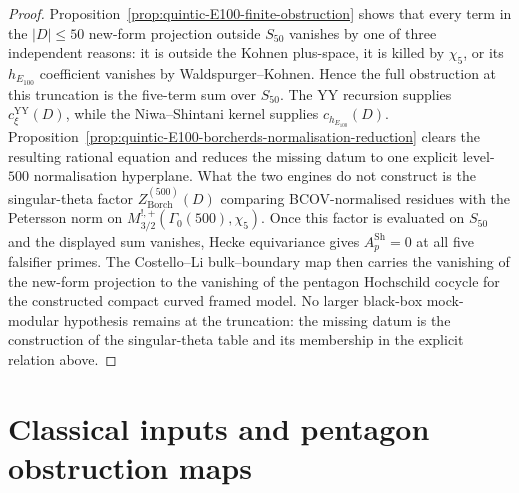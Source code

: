 \begin{proof}
Proposition~\ref{prop:quintic-E100-finite-obstruction}
shows that every term in the $|D|\le 50$ new-form projection outside
$S_{50}$ vanishes by one of three independent reasons: it is outside the
Kohnen plus-space, it is killed by $\chi_5$, or its
$h_{E_{100}}$ coefficient vanishes by Waldspurger--Kohnen. Hence the
full obstruction at this truncation is the five-term sum over $S_{50}$.
The YY recursion supplies $c_{\xi}^{\mathrm{YY}}(D)$, while the
Niwa--Shintani kernel supplies $c_{h_{E_{100}}}(D)$. Proposition~\ref{prop:quintic-E100-borcherds-normalisation-reduction}
clears the resulting rational equation and reduces the missing datum to
one explicit level-$500$ normalisation hyperplane. What the two engines
do not construct is the singular-theta factor
$Z_{\mathrm{Borch}}^{(500)}(D)$ comparing BCOV-normalised residues with
the Petersson norm on $M_{3/2}^{!,+}(\Gamma_0(500),\chi_5)$. Once this
factor is evaluated on $S_{50}$ and the displayed sum vanishes, Hecke
equivariance gives $A_p^{\mathrm{Sh}}=0$ at all five falsifier primes.
The Costello--Li bulk--boundary map then carries the vanishing of the
new-form projection to the vanishing of the pentagon Hochschild cocycle
for the constructed compact curved framed model. No larger black-box
mock-modular hypothesis remains at the truncation: the missing datum is
the construction of the singular-theta table and its membership in the
explicit relation above.
\end{proof}

\section{Classical inputs and pentagon obstruction maps}
\label{sec:pentagon-closures-hziv}

